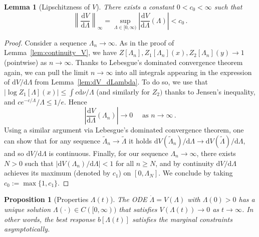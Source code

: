 \documentclass[11pt,a4paper,final]{article}
\renewcommand{\d}{\mathrm{d}}
\newcommand{\1}{\mathbf{1}}
\theoremstyle{plain}
\newtheorem{lemma}[theorem]{Lemma}
\newtheorem{proposition}[theorem]{Proposition}
\numberwithin{equation}{section}
\numberwithin{theorem}{section}
\begin{document}
\begin{lemma}[Lipschitzness of $V$]\label{lem:V-Lip}
There exists a constant $0<c_0<\infty$ such that 
$$
\left\|\frac{\d V}{\d\Lambda}\right\|_\infty=\sup_{\Lambda\in[0,\infty)}\left|\frac{\d V}{\d\Lambda}(\Lambda)\right|<c_0\,.
$$
\end{lemma}
\begin{proof}
Consider a sequence $\Lambda_n\to\infty$. As in the proof of Lemma~\ref{lem:continuity_V}, we have $Z[\Lambda_n], Z_1[\Lambda_n](x), Z_2[\Lambda_n](y)\to 1$  (pointwise) as $n\to\infty$. Thanks to Lebesgue's dominated convergence theorem again, we can pull the limit $n\to \infty$ into all integrals appearing in the expression of $\d V/\d\Lambda$ from Lemma~\ref{lem:dV_dLambda}. To do so, we use that $|\log Z_1[\Lambda](x)|\le \int c\d\nu/\Lambda$ (and similarly for $Z_2)$ thanks to Jensen's inequality, and $ce^{-c/\Lambda}/\Lambda\le 1/e$. Hence
$$
\left|\frac{\d V}{\d\Lambda}(\Lambda_n)\right|\to 0 \quad \text{ as } n\to \infty\,.
$$
Using a similar argument via Lebesgue's dominated convergence theorem, one can show that for any sequence $\tilde\Lambda_n\to\tilde\Lambda$ it holds $\d V(\tilde\Lambda_n)/\d\Lambda\to \d V(\tilde\Lambda)/\d\Lambda$, and so $\d V/\d\Lambda$ is continuous.
Finally, for our sequence $\Lambda_n\to\infty$, there exists $N>0$ such that $|\d V(\Lambda_n)/\d\Lambda|<1$ for all $n\ge N$, and by continuity $\d V/\d\Lambda$ achieves its maximum (denoted by $c_1$) on $[0,\Lambda_N]$. We conclude by taking $c_0:=\max\{1,c_1\}$.
\end{proof}
\begin{proposition}[Properties $\Lambda(t)$]\label{prop:Lambda-properties}
    The ODE $\dot\Lambda=V(\Lambda)$ with $\Lambda(0)>0$ has a unique solution $\Lambda(\cdot)\in C([0,\infty))$ that satisfies $V(\Lambda(t))\to 0$ as $t\to\infty$. In other words, the best response $b[\Lambda(t)]$ satisfies the marginal constraints asymptotically.
\end{proposition}
\end{document}
